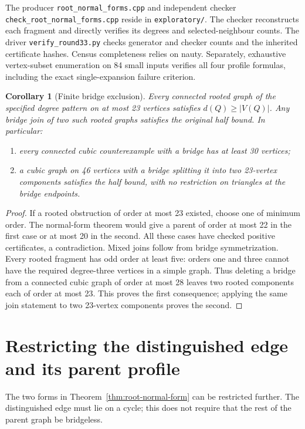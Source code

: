 \documentclass[11pt]{article}
\newtheorem{corollary}[theorem]{Corollary}
\begin{document}
The producer \texttt{root\_normal\_forms.cpp} and independent checker
\texttt{check\_root\_normal\_\allowbreak forms.cpp} reside in \texttt{exploratory/}.
The checker reconstructs each fragment and directly verifies its degrees
and selected-neighbour counts. The driver \texttt{verify\_round33.py}
checks generator and checker counts and the inherited certificate hashes.
Census completeness relies on nauty. Separately, exhaustive vertex-subset
enumeration on 84 small inputs verifies all four profile formulas,
including the exact single-expansion failure criterion.

\begin{corollary}[Finite bridge exclusion]\label{cor:root23-all}
Every connected rooted graph of the specified degree pattern on at most
23 vertices satisfies $d(Q)\geq|V(Q)|$. Any bridge join of two such
rooted graphs satisfies the original half bound. In particular:
\begin{enumerate}
\item every connected cubic counterexample with a bridge has at least
30 vertices;
\item a cubic graph on 46 vertices with a bridge splitting it into two
23-vertex components satisfies the half bound, with no restriction on
triangles at the bridge endpoints.
\end{enumerate}
\end{corollary}
\begin{proof}
If a rooted obstruction of order at most 23 existed, choose one of
minimum order. The normal-form theorem would give a parent of order
at most 22 in the first case or at most 20 in the second. All these
cases have checked positive certificates, a contradiction.
Mixed joins follow from bridge symmetrization.
Every rooted fragment has odd order at least five: orders one and
three cannot have the required degree-three vertices in a simple graph.
Thus deleting a bridge from a connected cubic graph of order at most
28 leaves two rooted components each of order at most 23. This proves
the first consequence; applying the same join statement to two
23-vertex components proves the second.
\end{proof}

\section{Restricting the distinguished edge and its parent profile}
The two forms in Theorem~\ref{thm:root-normal-form} can be restricted
further. The distinguished edge must lie on a cycle; this does not
require that the rest of the parent graph be bridgeless.
\end{document}
